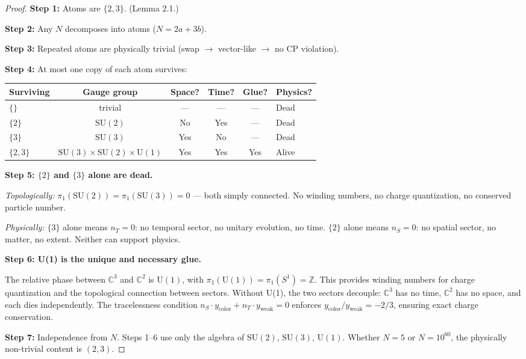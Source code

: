 \documentclass[12pt]{article}
\theoremstyle{remark}
\theoremstyle{definition}
\newcommand{\CC}{\mathbb{C}}
\begin{document}
\begin{proof}
\textbf{Step 1:} Atoms are $\{2, 3\}$. (Lemma 2.1.)

\textbf{Step 2:} Any $N$ decomposes into atoms ($N = 2a + 3b$).

\textbf{Step 3:} Repeated atoms are physically trivial (swap $\to$ vector-like $\to$ no CP violation).

\textbf{Step 4:} At most one copy of each atom survives:

\begin{center}
\begin{tabular}{lccccl}
\hline
Surviving & Gauge group & Space? & Time? & Glue? & Physics? \\
\hline
$\{\}$ & trivial & --- & --- & --- & Dead \\
$\{2\}$ & $\text{SU}(2)$ & No & Yes & --- & Dead \\
$\{3\}$ & $\text{SU}(3)$ & Yes & No & --- & Dead \\
$\{2, 3\}$ & $\text{SU}(3)\!\times\!\text{SU}(2)\!\times\!\text{U}(1)$ & Yes & Yes & Yes & Alive \\
\hline
\end{tabular}
\end{center}

\textbf{Step 5: $\{2\}$ and $\{3\}$ alone are dead.}

\emph{Topologically:} $\pi_1(\text{SU}(2)) = \pi_1(\text{SU}(3)) = 0$ --- both simply connected. No winding numbers, no charge quantization, no conserved particle number.

\emph{Physically:} $\{3\}$ alone means $n_T = 0$: no temporal sector, no unitary evolution, no time. $\{2\}$ alone means $n_S = 0$: no spatial sector, no matter, no extent. Neither can support physics.

\textbf{Step 6: U(1) is the unique and necessary glue.}

The relative phase between $\CC^3$ and $\CC^2$ is $\text{U}(1)$, with $\pi_1(\text{U}(1)) = \pi_1(S^1) = \mathbb{Z}$. This provides winding numbers for charge quantization and the topological connection between sectors. Without U(1), the two sectors decouple: $\CC^3$ has no time, $\CC^2$ has no space, and each dies independently. The tracelessness condition $n_S \cdot y_\text{color} + n_T \cdot y_\text{weak} = 0$ enforces $y_\text{color}/y_\text{weak} = -2/3$, ensuring exact charge conservation.

\textbf{Step 7:} Independence from $N$. Steps 1--6 use only the algebra of $\text{SU}(2)$, $\text{SU}(3)$, $\text{U}(1)$. Whether $N = 5$ or $N = 10^{60}$, the physically non-trivial content is $(2, 3)$.
\end{proof}
\end{document}
